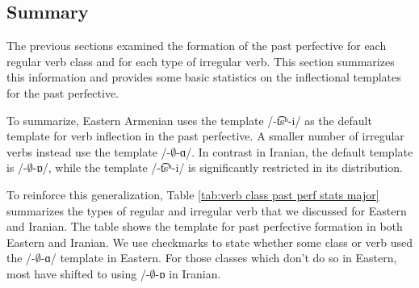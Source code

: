 \subsection{Summary}\label{section:verb:past:summary}

The previous sections examined the formation of the past perfective for each regular verb class and for each type of irregular verb. This section summarizes this information and provides some basic statistics on the inflectional templates for the past perfective. 

To summarize, Eastern Armenian uses the template {/-\t{ts}ʰ-i/} as the default template for  verb inflection in the past perfective. A smaller number of irregular verbs instead use the template   {/-$\emptyset$-ɑ/}. In contrast in Iranian, the default template is {/-$\emptyset$-ɒ/}, while the template {/-\t{ts}ʰ-i/}  is significantly restricted in its distribution. 

To reinforce this generalization, Table \ref{tab:verb class past perf stats major} summarizes the  types of regular and irregular verb that we discussed for Eastern and Iranian. The table shows the template for past perfective formation in both Eastern and Iranian. We use checkmarks to state whether some class or verb used the {/-$\emptyset$-ɑ/} template in Eastern. For those classes which don't do so in Eastern, most have shifted to using  {/-$\emptyset$-ɒ} in Iranian. 





